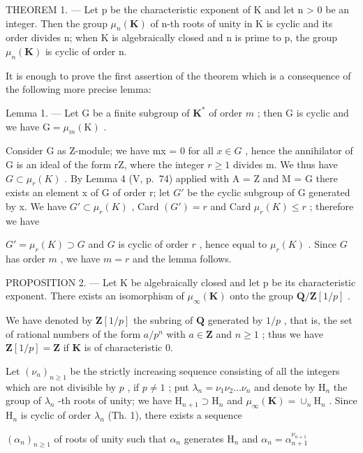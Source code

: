THEOREM 1. --- Let p be the characteristic exponent of K and let n \textgreater{} 0 be an integer. Then the group \(\mu_{n}(\mathbf{K})\) of n-th roots of unity in K is cyclic and its order divides n; when K is algebraically closed and n is prime to p, the group \(\mu_{n}(\mathbf{K})\) is cyclic of order n.

It is enough to prove the first assertion of the theorem which is a consequence of the following more precise lemma:

Lemma 1. --- Let G be a finite subgroup of \(\mathbf{K}^*\) of order \(m\) ; then G is cyclic and we have \(\mathrm{G} = \mu_m(\mathrm{K})\) .

Consider G as Z-module; we have mx = 0 for all \(x \in G\) , hence the annihilator of G is an ideal of the form rZ, where the integer \(r \geqslant 1\) divides m. We thus have \(G \subset \mu_{r}(K)\) . By Lemma 4 (V, p.~74) applied with A = Z and M = G there exists an element x of G of order r; let \(G'\) be the cyclic subgroup of G generated by x. We have \(G' \subset \mu_{r}(K)\) , Card \((G') = r\) and Card \(\mu_{r}(K) \leqslant r\) ; therefore we have

\(G' = \mu_r(K) \supset G\) and \(G\) is cyclic of order \(r\) , hence equal to \(\mu_r(K)\) . Since \(G\) has order \(m\) , we have \(m = r\) and the lemma follows.

PROPOSITION 2. --- Let K be algebraically closed and let p be its characteristic exponent. There exists an isomorphism of \(\mu_{\infty}(\mathbf{K})\) onto the group \(\mathbf{Q}/\mathbf{Z}[1/p]\) .

We have denoted by \(\mathbf{Z}[1/p]\) the subring of \(\mathbf{Q}\) generated by \(1/p\) , that is, the set of rational numbers of the form \(a/p^n\) with \(a \in \mathbf{Z}\) and \(n \geqslant 1\) ; thus we have \(\mathbf{Z}[1/p] = \mathbf{Z}\) if \(\mathbf{K}\) is of characteristic 0.

Let \((\nu_{n})_{n\geqslant 1}\) be the strictly increasing sequence consisting of all the integers which are not divisible by \(p\) , if \(p\neq 1\) ; put \(\lambda_{n} = \nu_{1}\nu_{2}\dots \nu_{n}\) and denote by \(\mathrm{H}_n\) the group of \(\lambda_{n}\) -th roots of unity; we have \(\mathrm{H}_{n + 1}\supset \mathrm{H}_n\) and \(\mu_{\infty}(\mathbf{K}) = \cup_{n}\mathrm{H}_{n}\) . Since \(\mathrm{H}_n\) is cyclic of order \(\lambda_{n}\) (Th. 1), there exists a sequence

\((\alpha_{n})_{n\geqslant 1}\) of roots of unity such that \(\alpha_{n}\) generates \(\mathrm{H}_n\) and \(\alpha_{n} = \alpha_{n + 1}^{\nu_{n + 1}}\)

